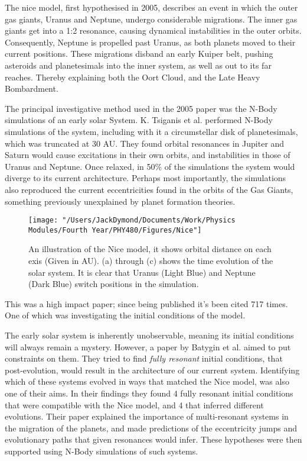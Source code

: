 \documentclass[a4paper,10pt]{article}
\begin{document}
The nice model, first hypothesised in 2005\cite{Nice}, describes an event in which the outer gas giants, Uranus and Neptune, undergo considerable migrations. The inner gas giants get into a 1:2 resonance, causing dynamical instabilities in the outer orbits. Consequently, Neptune is propelled past Uranus, as both planets moved to their current positions. These migrations disband an early Kuiper belt, pushing asteroids and planetesimals into the inner system, as well as out to its far reaches. Thereby explaining both the Oort Cloud, and the Late Heavy Bombardment. 

The principal investigative method used in the 2005 paper was the N-Body simulations of an early solar System. K. Tsiganis et al. performed N-Body simulations of the system, including with it a circumstellar disk of planetesimals, which was truncated at 30 AU. They found orbital resonances in Jupiter and Saturn would cause excitations in their own orbits, and instabilities in those of Uranus and Neptune. Once relaxed, in 50\% of the simulations the system would diverge to its current architecture. Perhaps most importantly, the simulations also reproduced the current eccentricities found in the orbits of the Gas Giants, something previously unexplained by planet formation theories.

\begin{figure}[h!]
\centering
\texttt{[image: "/Users/JackDymond/Documents/Work/Physics Modules/Fourth Year/PHY480/Figures/Nice"]}
\caption{An illustration of the Nice model, it shows orbital distance on each exis (Given in AU). (a) through (c) shows the time evolution of the solar system. It is clear that Uranus (Light Blue) and Neptune (Dark Blue) switch positions in the simulation.}
\label{NiceFig}
\end{figure}

This was a high impact paper; since being published it's been cited 717 times. One of which was investigating the initial conditions of the model. 

The early solar system is inherently unobservable, meaning its initial conditions will always remain a mystery. However, a paper by Batygin et al. aimed to put constraints on them\cite{Initial}. They tried to find \textit{fully resonant} initial conditions, that post-evolution, would result in the architecture of our current system. Identifying which of these systems evolved in ways that matched the Nice model, was also one of their aims. In their findings they found 4 fully resonant initial conditions that were compatible with the Nice model, and 4 that inferred different evolutions. Their paper explained the importance of multi-resonant systems in the migration of the planets, and made predictions of the eccentricity jumps and evolutionary paths that given resonances would infer. These hypotheses were then supported using N-Body simulations of such systems.
\end{document}
